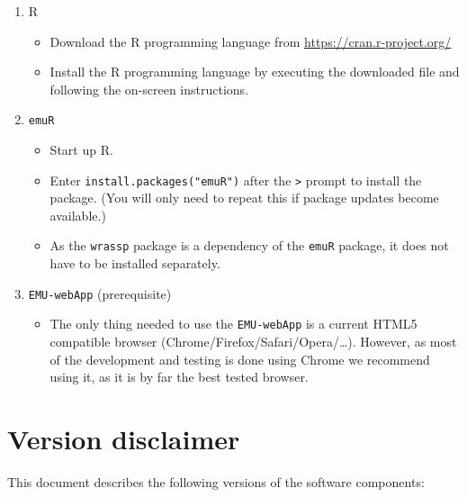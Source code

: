 \documentclass[]{book}
\providecommand{\tightlist}{%
  \setlength{\itemsep}{0pt}\setlength{\parskip}{0pt}}
\theoremstyle{definition}
\theoremstyle{definition}
\theoremstyle{definition}
\theoremstyle{remark}
\begin{document}
\begin{enumerate}
\def\labelenumi{\arabic{enumi}.}
\tightlist
\item
  R

  \begin{itemize}
  \tightlist
  \item
    Download the R programming language from
    \url{https://cran.r-project.org/}
  \item
    Install the R programming language by executing the downloaded file
    and following the on-screen instructions.
  \end{itemize}
\item
  \texttt{emuR}

  \begin{itemize}
  \tightlist
  \item
    Start up R.
  \item
    Enter \texttt{install.packages("emuR")} after the
    \texttt{\textgreater{}} prompt to install the package. (You will
    only need to repeat this if package updates become available.)
  \item
    As the \texttt{wrassp} package is a dependency of the \texttt{emuR}
    package, it does not have to be installed separately.
  \end{itemize}
\item
  \texttt{EMU-webApp} (prerequisite)

  \begin{itemize}
  \tightlist
  \item
    The only thing needed to use the \texttt{EMU-webApp} is a current
    HTML5 compatible browser (Chrome/Firefox/Safari/Opera/\ldots{}).
    However, as most of the development and testing is done using Chrome
    we recommend using it, as it is by far the best tested browser.
  \end{itemize}
\end{enumerate}

\hypertarget{version-disclaimer}{%
\section{Version disclaimer}\label{version-disclaimer}}

This document describes the following versions of the software
components:
\end{document}
